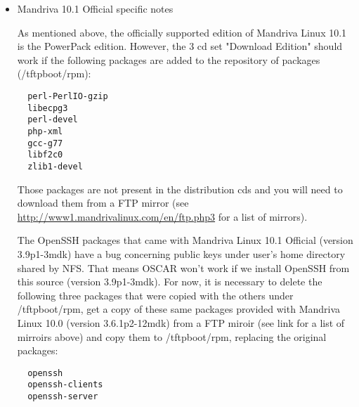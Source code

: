\begin{itemize}
\item Mandriva 10.1 Official specific notes

As mentioned above, the officially supported edition of Mandriva Linux 10.1
is the PowerPack edition. However, the 3 cd set "Download Edition"
should work if the following packages are added to the repository of 
packages (/tftpboot/rpm):
\begin{verbatim}
  perl-PerlIO-gzip
  libecpg3
  perl-devel
  php-xml
  gcc-g77
  libf2c0
  zlib1-devel
\end{verbatim} 
Those packages are not present in the distribution cds and you will need to
download them from a FTP mirror (see \url{http://www1.mandrivalinux.com/en/ftp.php3}
for a list of mirrors).

The OpenSSH packages that came with Mandriva Linux 10.1 Official (version 
3.9p1-3mdk) have a bug concerning public keys under user's home directory 
shared by NFS. That means OSCAR won't work if we install OpenSSH from this 
source (version 3.9p1-3mdk). For now, it is necessary to delete the following 
three packages that were copied with the others under /tftpboot/rpm, get a copy 
of these same packages provided with Mandriva Linux 10.0 (version 3.6.1p2-12mdk) 
from a FTP miroir (see link for a list of mirroirs above) and copy them to 
/tftpboot/rpm, replacing the original packages:
\begin{verbatim}
  openssh
  openssh-clients
  openssh-server
\end{verbatim}

\end{itemize}

